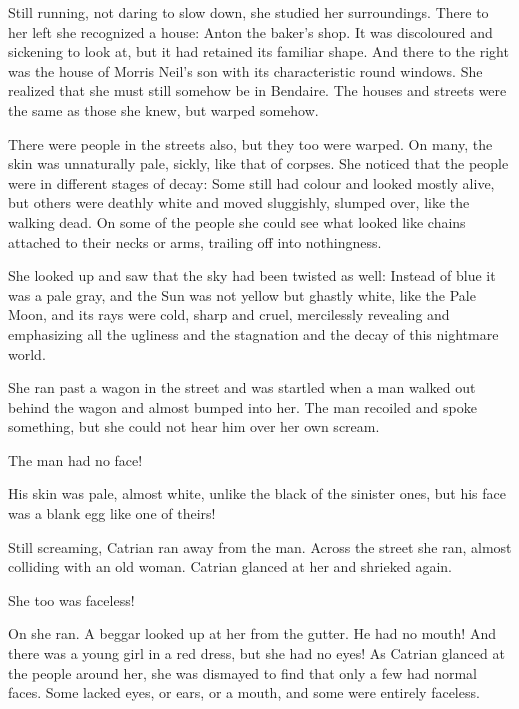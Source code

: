 \begin{garbage}
Still running, not daring to slow down, she studied her surroundings. There to her left she recognized a house: Anton the baker's shop. It was discoloured and sickening to look at, but it had retained its familiar shape. And there to the right was the house of Morris Neil's son with its characteristic round windows. 
She realized that she must still somehow be in Bendaire. The houses and streets were the same as those she knew, but warped somehow. 


There were people in the streets also, but they too were warped. On many, the skin was unnaturally pale, sickly, like that of corpses. She noticed that the people were in different stages of decay: Some still had colour and looked mostly alive, but others were deathly white and moved sluggishly, slumped over, like the walking dead. On some of the people she could see what looked like chains attached to their necks or arms, trailing off into nothingness. 

She looked up and saw that the sky had been twisted as well: Instead of blue it was a pale gray, and the Sun was not yellow but ghastly white, like the Pale Moon, and its rays were cold, sharp and cruel, mercilessly revealing and emphasizing all the ugliness and the stagnation and the decay of this nightmare world. 

She ran past a wagon in the street and was startled when a man walked out behind the wagon and almost bumped into her. The man recoiled and spoke something, but she could not hear him over her own scream. 

The man had no face! 

His skin was pale, almost white, unlike the black of the sinister ones, but his face was a blank egg like one of theirs! 

Still screaming, Catrian ran away from the man. Across the street she ran, almost colliding with an old woman. Catrian glanced at her and shrieked again. 

She too was faceless! 

On she ran. A beggar looked up at her from the gutter. He had no mouth! And there was a young girl in a red dress, but she had no eyes! As Catrian glanced at the people around her, she was dismayed to find that only a few had normal faces. Some lacked eyes, or ears, or a mouth, and some were entirely faceless.


\end{garbage}
